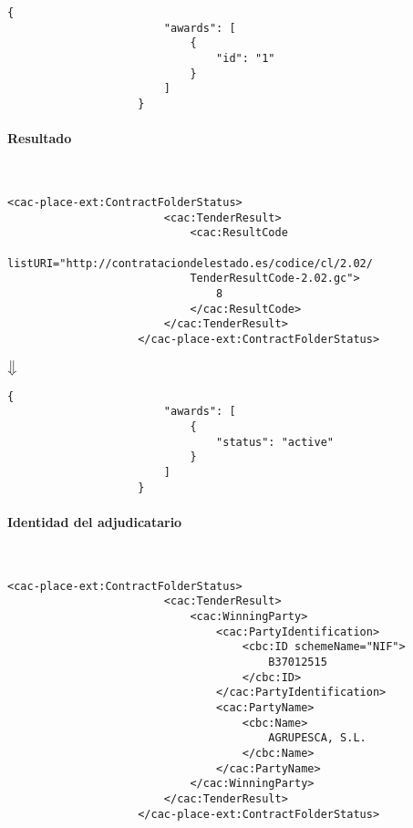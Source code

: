                 \begin{lstlisting}[language=lJSON]
                    {
                        "awards": [
                            {
                                "id": "1"
                            }
                        ]
                    }
                \end{lstlisting}
\newpage
            \paragraph{Resultado} \mbox{}\\
                \begin{lstlisting}[language=lXML]
                    <cac-place-ext:ContractFolderStatus>
                        <cac:TenderResult>
                            <cac:ResultCode
                            listURI="http://contrataciondelestado.es/codice/cl/2.02/
                            TenderResultCode-2.02.gc">
                                8
                            </cac:ResultCode>
                        </cac:TenderResult>
                    </cac-place-ext:ContractFolderStatus>
                \end{lstlisting}
                
                \begin{center}
                    $\big\Downarrow$
                \end{center}
                
                \begin{lstlisting}[language=lJSON]
                    {
                        "awards": [
                            {
                                "status": "active"
                            }
                        ]
                    }
                \end{lstlisting}
            
            \paragraph{Identidad del adjudicatario} \mbox{}\\
                \begin{lstlisting}[language=lXML]
                    <cac-place-ext:ContractFolderStatus>
                        <cac:TenderResult>
                            <cac:WinningParty>
                                <cac:PartyIdentification>
                                    <cbc:ID schemeName="NIF">
                                        B37012515
                                    </cbc:ID>
                                </cac:PartyIdentification>
                                <cac:PartyName>
                                    <cbc:Name>
                                        AGRUPESCA, S.L.
                                    </cbc:Name>
                                </cac:PartyName>
                            </cac:WinningParty>
                        </cac:TenderResult>
                    </cac-place-ext:ContractFolderStatus>
                \end{lstlisting}
                
